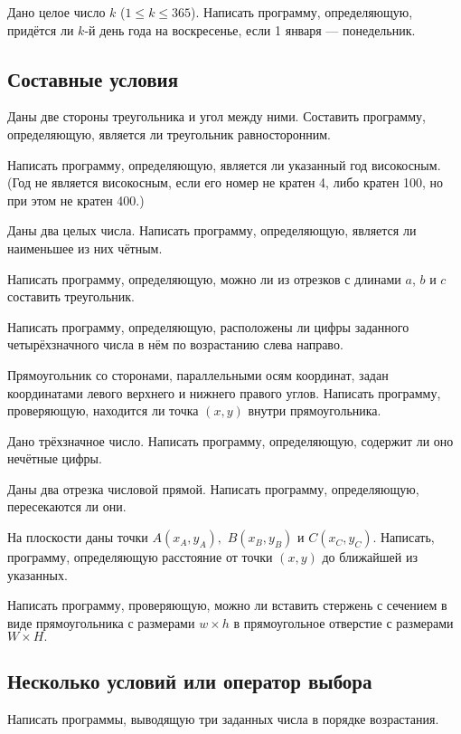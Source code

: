 \task Дано целое число $k$ ($1 \leqslant k \leqslant 365$). Написать
программу, определяющую, придётся ли $k$-й день года на воскресенье,
если 1 января — понедельник.


\subsection{Составные условия} 

\task Даны две стороны треугольника и угол между ними. Составить
программу, определяющую, является ли треугольник равносторонним.

\task Написать программу, определяющую, является ли указанный год
високосным. (Год не является високосным, если его номер не кратен 4,
либо кратен 100, но при этом не кратен 400.)

\task Даны два целых числа. Написать программу, определяющую, является
ли наименьшее из них чётным.

\task Написать программу, определяющую, можно ли из отрезков с длинами
$a$, $b$ и $c$ составить треугольник.

\task Написать программу, определяющую, расположены ли цифры заданного
четырёхзначного числа в нём по возрастанию слева направо.

\task Прямоугольник со сторонами, параллельными осям координат, задан
координатами левого верхнего и нижнего правого углов. Написать
программу, проверяющую, находится ли точка $(x, y)$ внутри
прямоугольника.

\task Дано трёхзначное число. Написать программу, определяющую,
содержит ли оно нечётные цифры.

\task Даны два отрезка числовой прямой. Написать программу,
определяющую, пересекаются ли они.

\task На плоскости даны точки $A(x_A, y_A),$ $B(x_B, y_B)$ и $C(x_C,
y_C)$. Написать, программу, определяющую расстояние от точки $(x, y)$
до ближайшей из указанных.

\task Написать программу, проверяющую, можно ли вставить стержень с
сечением в виде прямоугольника с размерами $w\times h$ в прямоугольное
отверстие с размерами $W\times H.$


\subsection{Несколько условий или оператор выбора}

\task Написать программы, выводящую три заданных числа в порядке
возрастания.


